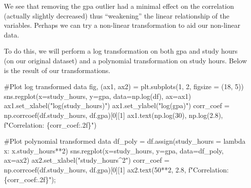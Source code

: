 \documentclass[
  letterpaper,
  DIV=11,
  numbers=noendperiod]{scrreprt}
\newenvironment{Shaded}{\begin{snugshade}}{\end{snugshade}}
\newcommand{\CommentTok}[1]{\textcolor[rgb]{0.37,0.37,0.37}{#1}}
\newcommand{\DecValTok}[1]{\textcolor[rgb]{0.68,0.00,0.00}{#1}}
\newcommand{\FloatTok}[1]{\textcolor[rgb]{0.68,0.00,0.00}{#1}}
\newcommand{\KeywordTok}[1]{\textcolor[rgb]{0.00,0.23,0.31}{#1}}
\newcommand{\NormalTok}[1]{\textcolor[rgb]{0.00,0.23,0.31}{#1}}
\newcommand{\OperatorTok}[1]{\textcolor[rgb]{0.37,0.37,0.37}{#1}}
\newcommand{\SpecialCharTok}[1]{\textcolor[rgb]{0.37,0.37,0.37}{#1}}
\newcommand{\SpecialStringTok}[1]{\textcolor[rgb]{0.13,0.47,0.30}{#1}}
\newcommand{\StringTok}[1]{\textcolor[rgb]{0.13,0.47,0.30}{#1}}
\begin{document}
We see that removing the gpa outlier had a minimal effect on the
correlation (actually slightly decreased) thus ``weakening'' the linear
relationship of the variables. Perhaps we can try a non-linear
transformation to aid our non-linear data.

To do this, we will perform a log transformation on both gpa and study
hours (on our original dataset) and a polynomial transformation on study
hours. Below is the result of our transformations.

\begin{Shaded}
\begin{Highlighting}[]
\CommentTok{\#Plot log transformed data}
\NormalTok{fig, (ax1, ax2) }\OperatorTok{=}\NormalTok{ plt.subplots(}\DecValTok{1}\NormalTok{, }\DecValTok{2}\NormalTok{, figsize }\OperatorTok{=}\NormalTok{ (}\DecValTok{18}\NormalTok{, }\DecValTok{5}\NormalTok{))}
\NormalTok{sns.regplot(x}\OperatorTok{=}\StringTok{\textquotesingle{}study\_hours\textquotesingle{}}\NormalTok{, y}\OperatorTok{=}\StringTok{\textquotesingle{}gpa\textquotesingle{}}\NormalTok{, data}\OperatorTok{=}\NormalTok{np.log(df), ax}\OperatorTok{=}\NormalTok{ax1)}
\NormalTok{ax1.set\_xlabel(}\StringTok{"log(study\_hours)"}\NormalTok{)}
\NormalTok{ax1.set\_ylabel(}\StringTok{"log(gpa)"}\NormalTok{)}
\NormalTok{corr\_coef }\OperatorTok{=}\NormalTok{ np.corrcoef(df.study\_hours, df.gpa)[}\DecValTok{0}\NormalTok{][}\DecValTok{1}\NormalTok{]}
\NormalTok{ax1.text(np.log(}\DecValTok{30}\NormalTok{), np.log(}\FloatTok{2.8}\NormalTok{), }\SpecialStringTok{f"Correlation: }\SpecialCharTok{\{}\NormalTok{corr\_coef}\SpecialCharTok{:.2f\}}\SpecialStringTok{"}\NormalTok{)}

\CommentTok{\#Plot polynomial transformed data}
\NormalTok{df\_poly }\OperatorTok{=}\NormalTok{ df.assign(study\_hours }\OperatorTok{=} \KeywordTok{lambda}\NormalTok{ x: x.study\_hours}\OperatorTok{**}\DecValTok{2}\NormalTok{)}
\NormalTok{sns.regplot(x}\OperatorTok{=}\StringTok{\textquotesingle{}study\_hours\textquotesingle{}}\NormalTok{, y}\OperatorTok{=}\StringTok{\textquotesingle{}gpa\textquotesingle{}}\NormalTok{, data}\OperatorTok{=}\NormalTok{df\_poly, ax}\OperatorTok{=}\NormalTok{ax2)}
\NormalTok{ax2.set\_xlabel(}\StringTok{"study\_hours\^{}2"}\NormalTok{)}
\NormalTok{corr\_coef }\OperatorTok{=}\NormalTok{ np.corrcoef(df.study\_hours, df.gpa)[}\DecValTok{0}\NormalTok{][}\DecValTok{1}\NormalTok{]}
\NormalTok{ax2.text(}\DecValTok{50}\OperatorTok{**}\DecValTok{2}\NormalTok{, }\FloatTok{2.8}\NormalTok{, }\SpecialStringTok{f"Correlation: }\SpecialCharTok{\{}\NormalTok{corr\_coef}\SpecialCharTok{:.2f\}}\SpecialStringTok{"}\NormalTok{)}\OperatorTok{;}
\end{Highlighting}
\end{Shaded}
\end{document}
